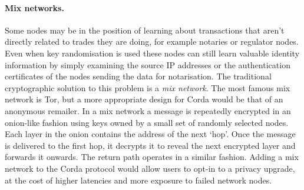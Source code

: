 \documentclass{article}
\begin{document}
\paragraph{Mix networks.}Some nodes may be in the position of learning about transactions that aren't directly
related to trades they are doing, for example notaries or regulator nodes. Even when key randomisation is used
these nodes can still learn valuable identity information by simply examining the source IP addresses or the
authentication certificates of the nodes sending the data for notarisation. The traditional cryptographic solution
to this problem is a \emph{mix network}\cite{Chaum:1981:UEM:358549.358563}. The most famous mix network is Tor, but
a more appropriate design for Corda would be that of an anonymous remailer. In a mix network a message is
repeatedly encrypted in an onion-like fashion using keys owned by a small set of randomly selected nodes. Each
layer in the onion contains the address of the next `hop'. Once the message is delivered to the first hop, it
decrypts it to reveal the next encrypted layer and forwards it onwards. The return path operates in a similar
fashion. Adding a mix network to the Corda protocol would allow users to opt-in to a privacy upgrade, at the cost
of higher latencies and more exposure to failed network nodes.
\end{document}
